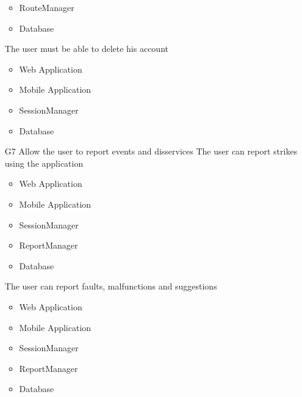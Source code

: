 \begin{itemize}
\begin{itemize}[leftmargin=1in]
 		\item RouteManager
 		\item Database
 	\end{itemize}
 	\subitem[G6.3] The user must be able to delete his account
 	\begin{itemize}[leftmargin=1in]
 		\item Web Application
 		\item Mobile Application
 		\item SessionManager
 		\item Database
 	\end{itemize}
 	\item[G7] Allow the user to report events and disservices 
 	\subitem[G7.1] The user can report strikes using the application
 	\begin{itemize}[leftmargin=1in]
 		\item Web Application
 		\item Mobile Application
 		\item SessionManager
 		\item ReportManager
 		\item Database
 	\end{itemize}
 	\subitem[G7.2] The user can report faults, malfunctions and suggestions
 	\begin{itemize}[leftmargin=1in]
 		\item Web Application
 		\item Mobile Application
 		\item SessionManager
 		\item ReportManager
 		\item Database
 	\end{itemize}
 
 \end{itemize}
